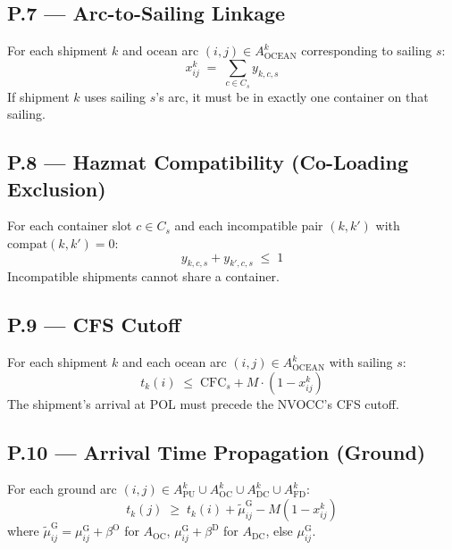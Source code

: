 \documentclass[11pt,a4paper]{article}
\theoremstyle{definition}
\begin{document}
\subsection*{P.7 — Arc-to-Sailing Linkage}

For each shipment $k$ and ocean arc $(i,j) \in A^k_{\text{OCEAN}}$ corresponding to sailing $s$:
\begin{equation}
  x_{ij}^k \;=\; \sum_{c \in C_s} y_{k,c,s}
  \label{eq:lcl-P7}
\end{equation}
If shipment $k$ uses sailing $s$'s arc, it must be in exactly one container on that sailing.

\subsection*{P.8 — Hazmat Compatibility (Co-Loading Exclusion)}

For each container slot $c \in C_s$ and each incompatible pair $(k, k')$ with $\text{compat}(k, k') = 0$:
\begin{equation}
  y_{k,c,s} + y_{k',c,s} \;\leq\; 1
  \label{eq:lcl-P8}
\end{equation}
Incompatible shipments cannot share a container.

\subsection*{P.9 — CFS Cutoff}

For each shipment $k$ and each ocean arc $(i,j) \in A^k_{\text{OCEAN}}$ with sailing $s$:
\begin{equation}
  t_k(i) \;\leq\; \text{CFC}_s + M \cdot (1 - x_{ij}^k)
  \label{eq:lcl-P9}
\end{equation}
The shipment's arrival at POL must precede the NVOCC's CFS cutoff.

\subsection*{P.10 — Arrival Time Propagation (Ground)}

For each ground arc $(i,j) \in A^k_{\text{PU}} \cup A^k_{\text{OC}} \cup A^k_{\text{DC}} \cup A^k_{\text{FD}}$:
\begin{equation}
  t_k(j) \;\geq\; t_k(i) + \tilde{\mu}_{ij}^{\text{G}} - M (1 - x_{ij}^k)
  \label{eq:lcl-P10}
\end{equation}
where $\tilde{\mu}_{ij}^{\text{G}} = \mu_{ij}^{\text{G}} + \beta^{\text{O}}$ for $A_{\text{OC}}$,
$\mu_{ij}^{\text{G}} + \beta^{\text{D}}$ for $A_{\text{DC}}$, else $\mu_{ij}^{\text{G}}$.
\end{document}

